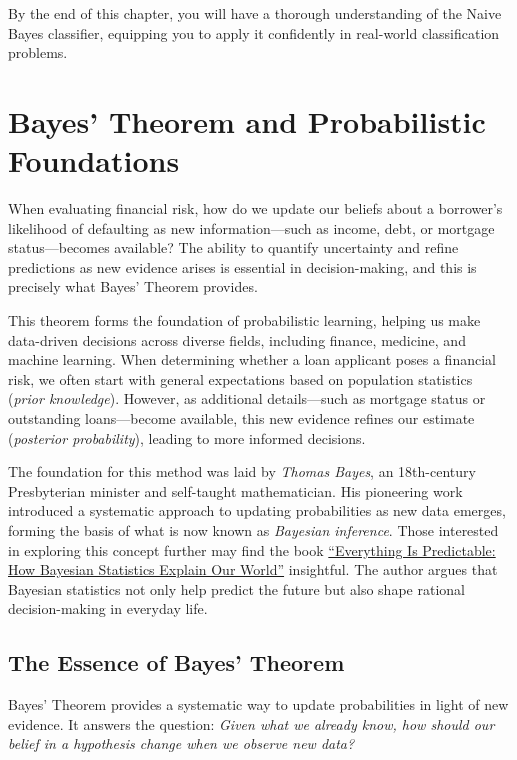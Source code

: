 \documentclass[
  11pt,
]{book}
\theoremstyle{definition}
\theoremstyle{definition}
\theoremstyle{definition}
\theoremstyle{definition}
\theoremstyle{remark}
\begin{document}
By the end of this chapter, you will have a thorough understanding of the Naive Bayes classifier, equipping you to apply it confidently in real-world classification problems.

\section{Bayes' Theorem and Probabilistic Foundations}\label{bayes-theorem-and-probabilistic-foundations}

When evaluating financial risk, how do we update our beliefs about a borrower's likelihood of defaulting as new information---such as income, debt, or mortgage status---becomes available? The ability to quantify uncertainty and refine predictions as new evidence arises is essential in decision-making, and this is precisely what Bayes' Theorem provides.

This theorem forms the foundation of probabilistic learning, helping us make data-driven decisions across diverse fields, including finance, medicine, and machine learning. When determining whether a loan applicant poses a financial risk, we often start with general expectations based on population statistics (\emph{prior knowledge}). However, as additional details---such as mortgage status or outstanding loans---become available, this new evidence refines our estimate (\emph{posterior probability}), leading to more informed decisions.

The foundation for this method was laid by \emph{Thomas Bayes}, an 18th-century Presbyterian minister and self-taught mathematician. His pioneering work introduced a systematic approach to updating probabilities as new data emerges, forming the basis of what is now known as \emph{Bayesian inference}. Those interested in exploring this concept further may find the book \href{https://www.goodreads.com/book/show/199798096-everything-is-predictable}{``Everything Is Predictable: How Bayesian Statistics Explain Our World''} insightful. The author argues that Bayesian statistics not only help predict the future but also shape rational decision-making in everyday life.

\subsection*{The Essence of Bayes' Theorem}\label{the-essence-of-bayes-theorem}


Bayes' Theorem provides a systematic way to update probabilities in light of new evidence. It answers the question: \emph{Given what we already know, how should our belief in a hypothesis change when we observe new data?}
\end{document}
